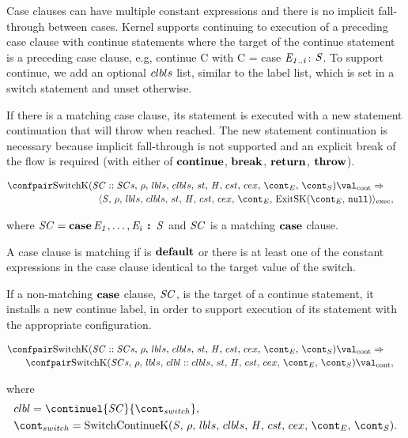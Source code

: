 \documentclass[a4paper,oneside]{article}
\newcommand{\synt}[1]{\ensuremath{\text{\textbf{#1}}}}
\DeclareMathOperator{\throw}{\synt{throw}}
\DeclareMathOperator{\bbreak}{\synt{break}}
\DeclareMathOperator{\continue}{\synt{continue}}
\DeclareMathOperator{\return}{\synt{return}}
\DeclareMathOperator{\case}{\synt{case}}
\DeclareMathOperator{\default}{\synt{default}}
\newcommand{\cesktranssplit}[2]{\ensuremath{{#1} \Rightarrow\\ {#2}}}
\begin{document}
Case clauses can have multiple constant expressions and there is no implicit fall-through between cases.
Kernel supports continuing to execution of a preceding case clause with continue statements where the target of the continue statement is a preceding case clause, e.g, continue C with C = case $\mathit{E}_\mathit{1..i}$: $\mathit{S}$.
To support continue, we add an optional $clbls$ list, similar to the label list, which is set in a switch statement and unset otherwise.

If there is a matching case clause, its statement is executed with a new statement continuation that will throw when reached.
The new statement continuation is necessary because implicit fall-through is not supported and an explicit break of the flow is required (with either of $\continue$, $\bbreak$, $\return$, $\throw$).

\begin{align*}
    &\begin{multlined}
        \cesktranssplit%
            {\contconf{\SwitchK{\scase :: \scases}{\clbls}}{\val}}%
            {\execconf{\stmt}{\env}{\lbls}{\clbls}{\handler}{\cstrace}{\cex}{\econt}{\ExitSK{\tt{null}}}},
    \end{multlined}
\end{align*}

\noindent where $\scase = \case \expri{1}, \dots, \expri{i} \synt{ : } \stmt$ and $\mathit{SC}$ is a matching $\case$ clause.

A case clause is matching if is $\default$ or there is at least one of the constant expressions in the case clause identical to the target value of the switch.

If a non-matching $\case$ clause, $\mathit{SC}$, is the target of a continue statement, it installs a new continue label, in order to support execution of its statement with the appropriate configuration.

\begin{align*}
    &\begin{multlined}
        \cesktranssplit
            {\contconf{\SwitchK{\scase :: \scases}{\clbls}}{\val}}%
            {\contconf{\SwitchK{\scases}{\clbl :: \clbls}}{\val}},
    \end{multlined}
\end{align*}

\noindent where
\begin{align*}
    &\clbl = \continuel{\scase}{\switchcont},\\
    &\switchcont = \ContinueK.
\end{align*}
\end{document}
